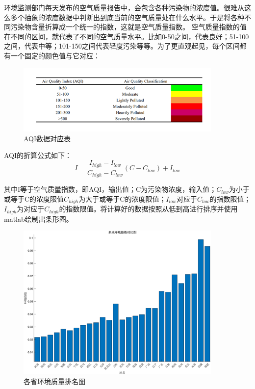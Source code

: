 \documentclass[UTF8]{ctexart}
\begin{document}
环境监测部门每天发布的空气质量报告中，会包含各种污染物的浓度值。很难从这么多个抽象的浓度数据中判断出到底当前的空气质量处在什么水平。于是将各种不同污染物含量折算成一个统一的指数，这就是空气质量指数。 空气质量指数的值在不同的区间，就代表了不同的空气质量水平。比如0-50之间，代表良好；51-100之间，代表中等；101-150之间代表轻度污染等等。为了更直观起见，每个区间都有一个固定的颜色值与它对应：

\begin{figure}[H] %
    \centering %
    \includegraphics[width=0.9\textwidth]{./picture/biaoge2.png} %
    \caption{AQI数据对应表} 
\end{figure}

AQI的折算公式如下：
\begin{equation}
    I=\frac{I_{high}-I_{low}}{C_{high}-C_{low}}(C-C_{low})+I_{low}
\end{equation}

其中I等于空气质量指数，即AQI，输出值；C为污染物浓度，输入值；$C_{low}$为小于或等于C的浓度限值$C_{high}$为大于或等于C的浓度限值；$I_{low}$对应于$C_{low}$的指数限值；$I_{high}$为对应于$C_{high}$的指数限值。将计算好的数据按照从低到高进行排序并使用matlab绘制出条形图。

\begin{figure}[H] %
    \centering %
    \includegraphics[width=0.9\textwidth]{./picture/geshengpaiming.png} %
    \caption{各省环境质量排名图} 
\end{figure}
\end{document}
